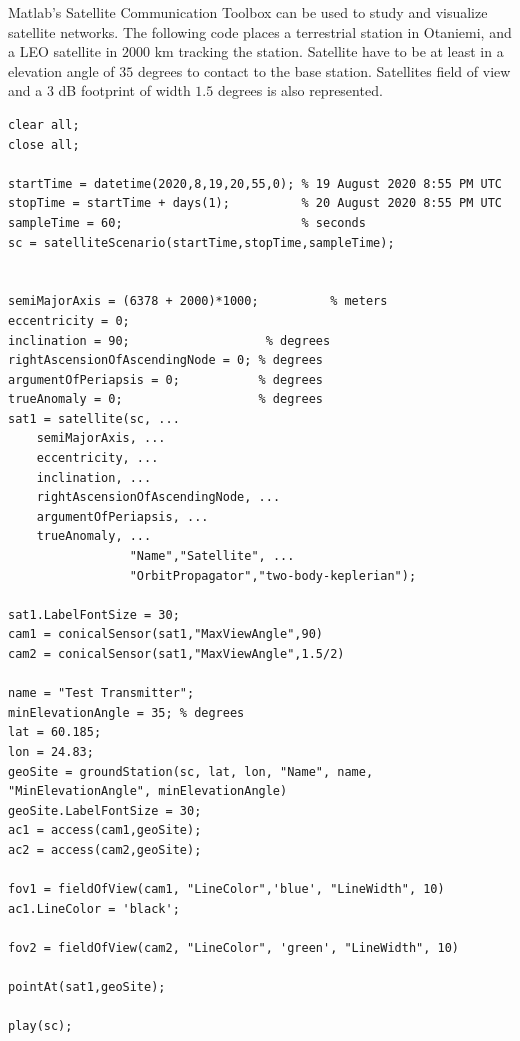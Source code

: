 \documentclass{article}
\begin{document}
Matlab's Satellite Communication Toolbox can be used to study and visualize satellite networks. The following code places a terrestrial station in Otaniemi, and a LEO satellite in $2000$ km tracking the station. Satellite have to be at least in a elevation angle of $35$ degrees to contact to the base station. Satellites field of view and a $3$ dB footprint of width $1.5$ degrees is also represented.

\begin{verbatim}
clear all;
close all;

startTime = datetime(2020,8,19,20,55,0); % 19 August 2020 8:55 PM UTC
stopTime = startTime + days(1);          % 20 August 2020 8:55 PM UTC
sampleTime = 60;                         % seconds
sc = satelliteScenario(startTime,stopTime,sampleTime);


semiMajorAxis = (6378 + 2000)*1000;          % meters
eccentricity = 0;
inclination = 90;                   % degrees
rightAscensionOfAscendingNode = 0; % degrees
argumentOfPeriapsis = 0;           % degrees
trueAnomaly = 0;                   % degrees
sat1 = satellite(sc, ...
    semiMajorAxis, ...
    eccentricity, ...
    inclination, ...
    rightAscensionOfAscendingNode, ...
    argumentOfPeriapsis, ...
    trueAnomaly, ...
                 "Name","Satellite", ...
                 "OrbitPropagator","two-body-keplerian");

sat1.LabelFontSize = 30;
cam1 = conicalSensor(sat1,"MaxViewAngle",90)
cam2 = conicalSensor(sat1,"MaxViewAngle",1.5/2)

name = "Test Transmitter";
minElevationAngle = 35; % degrees
lat = 60.185;
lon = 24.83;
geoSite = groundStation(sc, lat, lon, "Name", name, "MinElevationAngle", minElevationAngle)
geoSite.LabelFontSize = 30;
ac1 = access(cam1,geoSite);
ac2 = access(cam2,geoSite);

fov1 = fieldOfView(cam1, "LineColor",'blue', "LineWidth", 10)
ac1.LineColor = 'black';

fov2 = fieldOfView(cam2, "LineColor", 'green', "LineWidth", 10)

pointAt(sat1,geoSite);

play(sc);

\end{verbatim}
\end{document}
